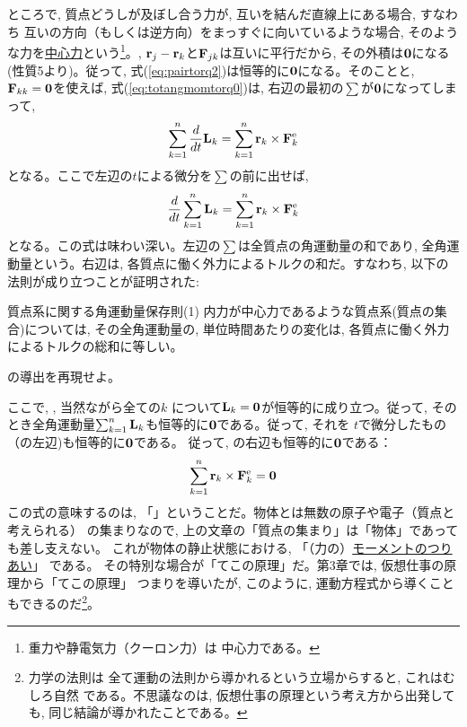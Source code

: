 ところで, 質点どうしが及ぼし合う力が, 互いを結んだ直線上にある場合, すなわち
互いの方向（もしくは逆方向）をまっすぐに向いているような場合, 
そのような力を\underline{中心力}という\footnote{重力や静電気力（クーロン力）は
中心力である。}。, ${\bf r}_j-{\bf r}_k$と${\bf F}_{jk}$は互いに平行だから, 
その外積は${\bf 0}$になる(性質5より)。従って, 
式(\ref{eq:pairtorq2})は恒等的に${\bf 0}$になる。そのことと, ${\bf F}_{kk}={\bf 0}$を使えば, 
式(\ref{eq:totangmomtorq0})は, 右辺の最初の$\sum$が${\bf 0}$になってしまって, 
\begin{eqnarray} 
\sum_{k=1}^n \frac{d}{dt}{\bf L}_k=\sum_{k=1}^n{\bf r}_k\times{\bf F}_{k}^{\text{e}}
\end{eqnarray} 
となる。ここで左辺の$t$による微分を$\sum$の前に出せば, 
\begin{eqnarray} 
\frac{d}{dt}\sum_{k=1}^n {\bf L}_k=\sum_{k=1}^n{\bf r}_k\times{\bf F}_{k}^{\text{e}}\label{eq:totangmomtorq1}
\end{eqnarray} 
となる。この式は味わい深い。左辺の$\sum$は全質点の角運動量の和であり, 
全角運動量という。右辺は, 各質点に働く外力によるトルクの和だ。すなわち, 以下の法則が成り立つことが証明された:
\begin{itembox}{質点系に関する角運動量保存則(1)}
内力が中心力であるような質点系(質点の集合)については, その全角運動量の, 
単位時間あたりの変化は, 各質点に働く外力によるトルクの総和に等しい。
\end{itembox}

\begin{q}\label{q:derive_n_angmom} の導出を再現せよ。\end{q}

ここで, , 当然ながら全ての$k$
について${\bf L}_k={\bf 0}$が恒等的に成り立つ。従って, 
そのとき全角運動量$\sum_{k=1}^n{\bf L}_k$も恒等的に${\bf 0}$である。従って, それを
$t$で微分したもの（の左辺)も恒等的に${\bf 0}$である。
従って, の右辺も恒等的に${\bf 0}$である：
\begin{eqnarray} 
\sum_{k=1}^n{\bf r}_k\times{\bf F}_{k}^{\text{e}}={\bf 0}\label{eq:totangmomtorq2}
\end{eqnarray} 
この式の意味するのは, 「」ということだ。物体とは無数の原子や電子（質点と考えられる）
の集まりなので, 上の文章の「質点の集まり」は「物体」であっても差し支えない。
これが物体の静止状態における, 「（力の）\underline{モーメントのつりあい}」
である。
その特別な場合が「てこの原理」だ。第3章では, 仮想仕事の原理から「てこの原理」
つまりを導いたが, このように, 
運動方程式から導くこともできるのだ\footnote{力学の法則は
全て運動の法則から導かれるという立場からすると, これはむしろ自然
である。不思議なのは, 仮想仕事の原理という考え方から出発しても, 
同じ結論が導かれたことである。}。\mv

